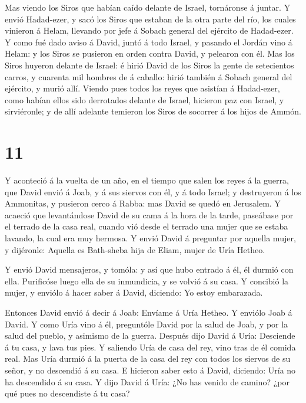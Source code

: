  Mas viendo los Siros que habían caído delante de Israel,
tornáronse á juntar.  Y envió Hadad-ezer, y sacó los Siros
que estaban de la otra parte del río, los cuales vinieron á Helam,
llevando por jefe á Sobach general del ejército de Hadad-ezer.
 Y como fué dado aviso á David, juntó á todo Israel, y
pasando el Jordán vino á Helam: y los Siros se pusieron en orden contra
David, y pelearon con él.  Mas los Siros huyeron delante de
Israel: é hirió David de los Siros la gente de setecientos carros, y
cuarenta mil hombres de á caballo: hirió también á Sobach general del
ejército, y murió allí.  Viendo pues todos los reyes que
asistían á Hadad-ezer, como habían ellos sido derrotados delante de
Israel, hicieron paz con Israel, y sirviéronle; y de allí adelante
temieron los Siros de socorrer á los hijos de Ammón.

\hypertarget{section-10}{%
\section{11}\label{section-10}}

 Y aconteció á la vuelta de un año, en el tiempo que salen
los reyes á la guerra, que David envió á Joab, y á sus siervos con él, y
á todo Israel; y destruyeron á los Ammonitas, y pusieron cerco á Rabba:
mas David se quedó en Jerusalem.  Y acaeció que levantándose
David de su cama á la hora de la tarde, paseábase por el terrado de la
casa real, cuando vió desde el terrado una mujer que se estaba lavando,
la cual era muy hermosa.  Y envió David á preguntar por
aquella mujer, y dijéronle: Aquella es Bath-sheba hija de Eliam, mujer
de Uría Hetheo.

 Y envió David mensajeros, y tomóla: y así que hubo entrado
á él, él durmió con ella. Purificóse luego ella de su inmundicia, y se
volvió á su casa.  Y concibió la mujer, y enviólo á hacer
saber á David, diciendo: Yo estoy embarazada.

 Entonces David envió á decir á Joab: Envíame á Uría Hetheo.
Y enviólo Joab á David.  Y como Uría vino á él, preguntóle
David por la salud de Joab, y por la salud del pueblo, y asimismo de la
guerra.  Después dijo David á Uría: Desciende á tu casa, y
lava tus pies. Y saliendo Uría de casa del rey, vino tras de él comida
real.  Mas Uría durmió á la puerta de la casa del rey con
todos los siervos de su señor, y no descendió á su casa.  E
hicieron saber esto á David, diciendo: Uría no ha descendido á su casa.
Y dijo David á Uría: ¿No has venido de camino? ¿por qué pues no
descendiste á tu casa?

